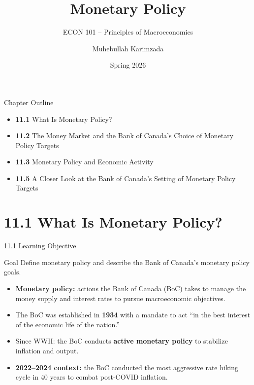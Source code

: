 \documentclass[aspectratio=169]{beamer}
\title{\textbf{Monetary Policy}}
\subtitle{{\large ECON 101 -- Principles of Macroeconomics}}
\author{Muhebullah Karimzada}
\date{Spring 2026}
\begin{document}

\begin{frame}[plain]
  \titlepage
\end{frame}

\begin{frame}{Chapter Outline}
\transfade
\begin{itemize}
  \item \textbf{11.1} What Is Monetary Policy?
  \item \textbf{11.2} The Money Market and the Bank of Canada's Choice of Monetary Policy Targets
  \item \textbf{11.3} Monetary Policy and Economic Activity
  \item \textbf{11.5} A Closer Look at the Bank of Canada's Setting of Monetary Policy Targets
\end{itemize}
\end{frame}

\section{11.1 What Is Monetary Policy?}

\begin{frame}{11.1 Learning Objective}
\transfade
\begin{block}{Goal}
Define monetary policy and describe the Bank of Canada's monetary policy goals.
\end{block}
\begin{itemize}
  \item \textbf{Monetary policy:} actions the Bank of Canada (BoC) takes to manage the money supply and interest rates to pursue macroeconomic objectives.
  \item The BoC was established in \textbf{1934} with a mandate to act ``in the best interest of the economic life of the nation.''
  \item Since WWII: the BoC conducts \textbf{active monetary policy} to stabilize inflation and output.
  \item \textbf{2022--2024 context:} the BoC conducted the most aggressive rate hiking cycle in 40 years to combat post-COVID inflation.
\end{itemize}
\end{frame}
\end{document}
